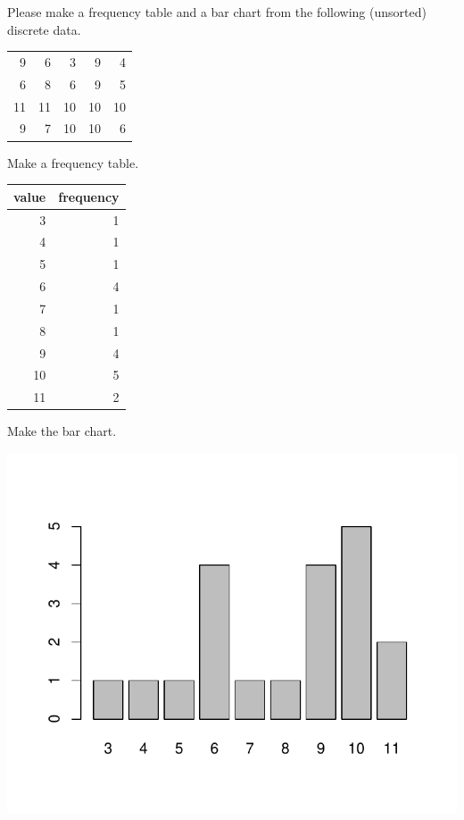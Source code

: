 
\begin{question}
Please make a frequency table and a bar chart from the following
(unsorted) discrete data.

\begin{longtable}[]{@{}rrrrr@{}}
\toprule
\endhead
9 & 6 & 3 & 9 & 4\tabularnewline
6 & 8 & 6 & 9 & 5\tabularnewline
11 & 11 & 10 & 10 & 10\tabularnewline
9 & 7 & 10 & 10 & 6\tabularnewline
\bottomrule
\end{longtable}
\end{question}

\begin{solution}
Make a frequency table.

\begin{longtable}[]{@{}rr@{}}
\toprule
value & frequency\tabularnewline
\midrule
\endhead
3 & 1\tabularnewline
4 & 1\tabularnewline
5 & 1\tabularnewline
6 & 4\tabularnewline
7 & 1\tabularnewline
8 & 1\tabularnewline
9 & 4\tabularnewline
10 & 5\tabularnewline
11 & 2\tabularnewline
\bottomrule
\end{longtable}

Make the bar chart.

\includegraphics{barchart-1-3.pdf}\\
\end{solution}

